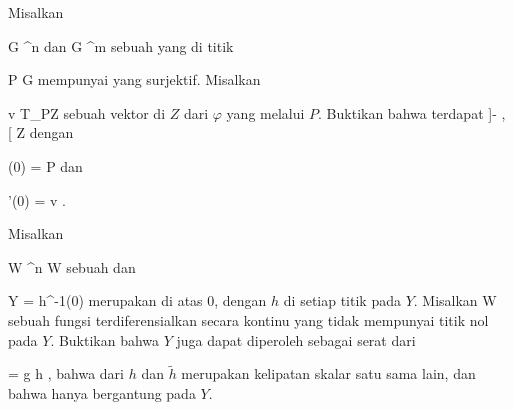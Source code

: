 \setcounter{section}{1}


{}
{

Misalkan

\mavergleichskette
{\vergleichskette
{ G
}
{ \subseteq }{ \R^n
}
{  }{
}
{    }{
}
{   }{
}
}
{}{}{}
dan
\maabbdisp {\varphi} { G } { \R^m
} {}
sebuah
yang di titik

\mavergleichskette
{\vergleichskette
{ P
}
{ \in }{ G
}
{  }{
}
{    }{
}
{   }{
}
}
{}{}{}
mempunyai
yang surjektif. Misalkan

\mavergleichskette
{\vergleichskette
{ v
}
{ \in }{ T_PZ
}
{  }{
}
{    }{
}
{   }{
}
}
{}{}{}
sebuah vektor di
$Z$ dari $\varphi$ yang melalui $P$. Buktikan bahwa terdapat
\maabbdisp {\gamma} { ]- \epsilon, \epsilon[ } { Z
} {}
 {} {}
dengan

\mavergleichskette
{\vergleichskette
{ \gamma(0)
}
{ = }{ P
}
{  }{
}
{    }{
}
{   }{
}
}
{}{}{}
dan

\mavergleichskettedisp
{\vergleichskette
{ \gamma'(0)
}
{ =} { v
}
{ } {
}
{ } {
}
{ } {
}
}
{}{}{.}

}
{} {}

{}
{

Misalkan

\mavergleichskette
{\vergleichskette
{ W
}
{ \subseteq }{ \R^n
}
{  }{
}
{    }{
}
{   }{
}
}
{}{}{}
 { W } { \R
} {}
sebuah
dan

\mavergleichskette
{\vergleichskette
{ Y
}
{ = }{ h^{-1}(0)
}
{  }{
}
{    }{
}
{   }{
}
}
{}{}{}
merupakan
di atas $0$, dengan $h$
di setiap titik pada $Y$. Misalkan
 { W } {\R
} {}
sebuah fungsi terdiferensialkan secara kontinu yang tidak mempunyai titik nol pada $Y$. Buktikan bahwa $Y$ juga dapat diperoleh sebagai serat dari

\mavergleichskettedisp
{\vergleichskette
{ 
}
{ =} { g h
}
{ } {
}
{ } {
}
{ } {
}
}
{}{}{,}
bahwa
dari $h$ dan $\tilde{h}$ merupakan kelipatan skalar satu sama lain, dan bahwa
hanya bergantung pada $Y$.

}
{} {}

